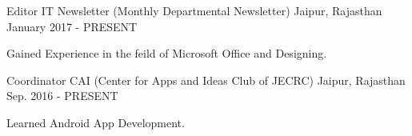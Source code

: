 \begin{cventries}
  \cventry
    {Editor}
    {IT Newsletter (Monthly Departmental Newsletter)}
    {Jaipur, Rajasthan}
    {January 2017 - PRESENT}
    {
      \begin{cvitems}
        \item {Gained Experience in the feild of Microsoft Office and Designing.}
      \end{cvitems}
    }
  \cventry
    {Coordinator}
    {CAI (Center for Apps and Ideas Club of JECRC)}
    {Jaipur, Rajasthan}
    {Sep. 2016 - PRESENT}
    {
      \begin{cvitems}
        \item {Learned Android App Development.}
      \end{cvitems}
    }
 
\end{cventries}

